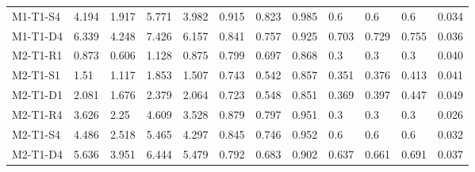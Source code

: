 \begin{table}[ht]
\begin{tabular}{llllllllllll}
  M1-T1-S4 & 4.194 & 1.917 & 5.771 & 3.982 & 0.915 & 0.823 & 0.985 & 0.6 & 0.6 & 0.6 &    0.034  \\ 
  M1-T1-D4 & 6.339 & 4.248 & 7.426 & 6.157 & 0.841 & 0.757 & 0.925 & 0.703 & 0.729 & 0.755 &    0.036  \\ 
  M2-T1-R1 & 0.873 & 0.606 & 1.128 & 0.875 & 0.799 & 0.697 & 0.868 & 0.3 & 0.3 & 0.3 &    0.040  \\ 
  M2-T1-S1 & 1.51 & 1.117 & 1.853 & 1.507 & 0.743 & 0.542 & 0.857 & 0.351 & 0.376 & 0.413 &    0.041  \\ 
  M2-T1-D1 & 2.081 & 1.676 & 2.379 & 2.064 & 0.723 & 0.548 & 0.851 & 0.369 & 0.397 & 0.447 &    0.049  \\ 
  M2-T1-R4 & 3.626 & 2.25 & 4.609 & 3.528 & 0.879 & 0.797 & 0.951 & 0.3 & 0.3 & 0.3 &    0.026  \\ 
  M2-T1-S4 & 4.486 & 2.518 & 5.465 & 4.297 & 0.845 & 0.746 & 0.952 & 0.6 & 0.6 & 0.6 &    0.032  \\ 
  M2-T1-D4 & 5.636 & 3.951 & 6.444 & 5.479 & 0.792 & 0.683 & 0.902 & 0.637 & 0.661 & 0.691 &    0.037  \\ 
   \hline
\end{tabular}
\end{table}
